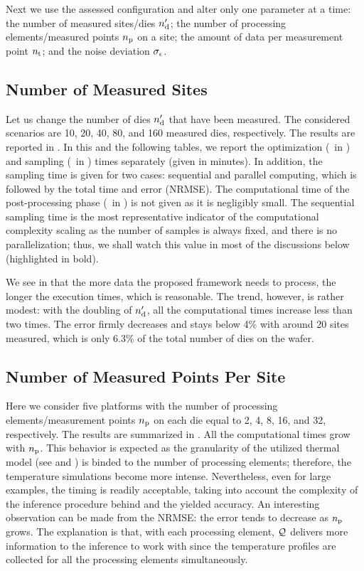 Next we use the assessed configuration and alter only one parameter at a time: the number of measured sites/dies ${n_\text{d}'}$; the number of processing elements/measured points ${n_\text{p}}$ on a site; the amount of data per measurement point ${n_\text{t}}$; and the noise deviation $\sigma_\epsilon$.

\subsection{Number of Measured Sites}
Let us change the number of dies ${n_\text{d}'}$ that have been measured.
The considered scenarios are 10, 20, 40, 80, and 160 measured dies, respectively.
The results are reported in .
In this and the following tables, we report the optimization (\ in ) and sampling (\ in ) times separately (given in minutes).
In addition, the sampling time is given for two cases: sequential and parallel computing, which is followed by the total time and error (NRMSE).
The computational time of the post-processing phase (\ in ) is not given as it is negligibly small.
The sequential sampling time is the most representative indicator of the computational complexity scaling as the number of samples is always fixed, and there is no parallelization; thus, we shall watch this value in most of the discussions below (highlighted in bold).

We see in  that the more data the proposed framework needs to process, the longer the execution times, which is reasonable.
The trend, however, is rather modest: with the doubling of ${n_\text{d}'}$, all the computational times increase less than two times.
The error firmly decreases and stays below 4\% with around 20 sites measured, which is only 6.3\% of the total number of dies on the wafer.

\subsection{Number of Measured Points Per Site}
Here we consider five platforms with the number of processing elements/measurement points ${n_\text{p}}$ on each die equal to 2, 4, 8, 16, and 32, respectively.
The results are summarized in .
All the computational times grow with ${n_\text{p}}$.
This behavior is expected as the granularity of the utilized thermal model (see  and \cite{ukhov2012}) is binded to the number of processing elements; therefore, the temperature simulations become more intense.
Nevertheless, even for large examples, the timing is readily acceptable, taking into account the complexity of the inference procedure behind and the yielded accuracy.
An interesting observation can be made from the NRMSE: the error tends to decrease as ${n_\text{p}}$ grows.
The explanation is that, with each processing element, $\mathcal{Q}$ delivers more information to the inference to work with since the temperature profiles are collected for all the processing elements simultaneously.


